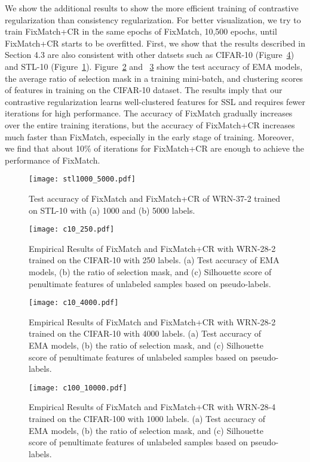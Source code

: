 \documentclass[letterpaper]{article} \usepackage{aaai22}  \usepackage{times}  \usepackage{helvet}  \usepackage{courier}  \usepackage[hyphens]{url}  \usepackage{graphicx} \urlstyle{rm} \def\UrlFont{\rm}  \usepackage{natbib}  \usepackage{caption} \DeclareCaptionStyle{ruled}{labelfont=normalfont,labelsep=colon,strut=off} \frenchspacing  \setlength{\pdfpagewidth}{8.5in}  \setlength{\pdfpageheight}{11in}  \usepackage{algorithm}
\begin{document}
We show the additional results to show the more efficient training of contrastive regularization than consistency regularization.
For better visualization, we try to train FixMatch+CR in the same epochs of FixMatch, 10,500 epochs, until FixMatch+CR starts to be overfitted.
First, we show that the results described in Section 4.3 are also consistent with other datsets such as CIFAR-10 (Figure~\ref{fig:supp_c100}) and STL-10 (Figure~\ref{fig:supp_stl}).
Figure~\ref{fig:supp_c10_250} and ~\ref{fig:supp_c10_4000} show the test accuracy of EMA models, the average ratio of selection mask in a training mini-batch, and clustering scores of features in training on the CIFAR-10 dataset.
The results imply that our contrastive regularization learns well-clustered features for SSL and requires fewer iterations for high performance.
The accuracy of FixMatch gradually increases over the entire training iterations, but the accuracy of FixMatch+CR increases much faster than FixMatch, especially in the early stage of training.
Moreover, we find that about 10\% of iterations for FixMatch+CR are enough to achieve the performance of FixMatch.





\begin{figure}
\centering
\texttt{[image: stl1000\_5000.pdf]}
\caption{Test accuracy of FixMatch and FixMatch+CR of WRN-37-2 trained on STL-10 with (a) 1000 and (b) 5000 labels.}
\label{fig:supp_stl}
\end{figure}

\begin{figure}
\centering
\texttt{[image: c10\_250.pdf]}
\caption{Empirical Results of FixMatch and FixMatch+CR with WRN-28-2 trained on the CIFAR-10 with 250 labels. (a) Test accuracy of EMA models, (b) the ratio of selection mask, and (c) Silhouette score of penultimate features of unlabeled samples based on pseudo-labels.}
\label{fig:supp_c10_250}
\end{figure}

\begin{figure}
\centering
\texttt{[image: c10\_4000.pdf]}
\caption{Empirical Results of FixMatch and FixMatch+CR with WRN-28-2 trained on the CIFAR-10 with 4000 labels. (a) Test accuracy of EMA models, (b) the ratio of selection mask, and (c) Silhouette score of penultimate features of unlabeled samples based on pseudo-labels.}
\label{fig:supp_c10_4000}
\end{figure}

\begin{figure}
\centering
\texttt{[image: c100\_10000.pdf]}
\caption{Empirical Results of FixMatch and FixMatch+CR with WRN-28-4 trained on the CIFAR-100 with 1000 labels. (a) Test accuracy of EMA models, (b) the ratio of selection mask, and (c) Silhouette score of penultimate features of unlabeled samples based on pseudo-labels.}
\label{fig:supp_c100}
\end{figure}
\end{document}
